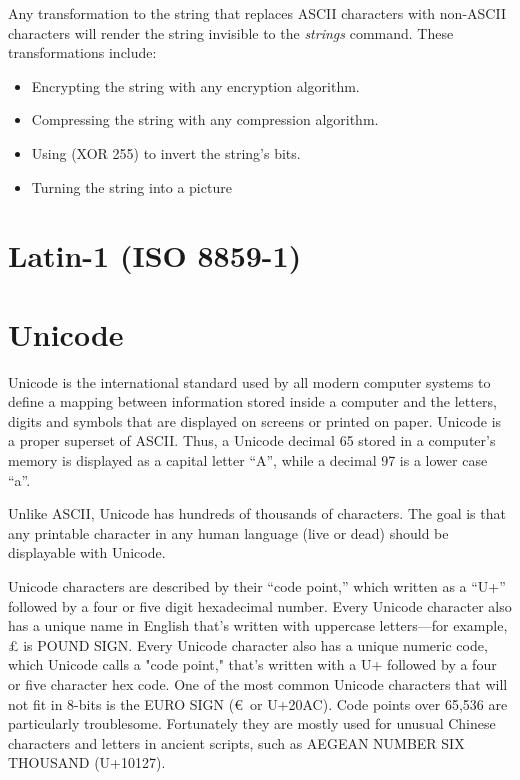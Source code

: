 Any transformation to the string that replaces ASCII characters with
non-ASCII characters will render the string invisible to the
\emph{strings} command. These transformations include:

\begin{itemize}
\item Encrypting the string with any encryption algorithm.
\item Compressing the string with any compression algorithm.
\item Using (XOR 255) to invert the string's bits.
\item Turning the string into a picture
\end{itemize}

\section{Latin-1 (ISO 8859-1)}

\section{Unicode}

Unicode is the international standard used by all modern computer
systems to define a mapping between information stored inside a
computer and the letters, digits and symbols that are displayed on
screens or printed on paper. Unicode is a proper superset of
ASCII. Thus, a Unicode decimal 65
stored in a computer's memory is displayed as a capital letter
``A'', while a decimal 97 is a lower case ``a''.

Unlike ASCII, Unicode has hundreds of thousands of characters. The
goal is that any printable character in any human language (live or
dead) should be displayable with Unicode. 

Unicode characters are described by their ``code point,'' which
written as a ``U+'' followed by a four or five digit hexadecimal
number. Every Unicode
character also has a unique name in English that's
written with uppercase letters---for example, \pounds\xspace is POUND SIGN. Every
Unicode character also has a unique numeric code, which Unicode calls
a "code point," that's written with a U+ followed by a four or five
character hex code. One of the most common Unicode characters that
will not fit in 8-bits is the EURO SIGN (\euro~or U+20AC). Code points over 65,536 are
particularly troublesome. Fortunately they are mostly used for unusual
Chinese characters and letters in ancient scripts, such as AEGEAN
NUMBER SIX THOUSAND (U+10127).

